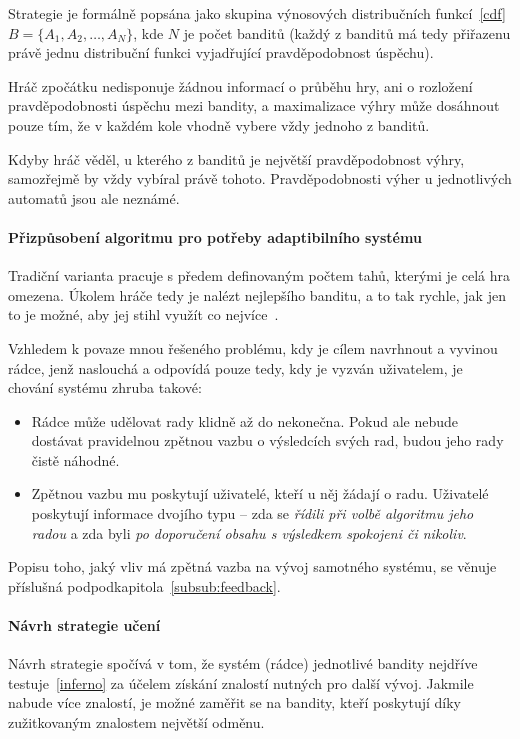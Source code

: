 \documentclass[thesis=M,czech]{FITthesis}[2014/05/07]
\begin{document}
Strategie je formálně popsána jako skupina výnosových distribučních funkcí~\ref{cdf} $B = \{ A_1, A_2, \ldots, A_N \}$, kde $N$ je počet banditů (každý z banditů má tedy přiřazenu právě jednu distribuční funkci vyjadřující pravděpodobnost úspěchu). 

Hráč zpočátku nedisponuje žádnou informací o průběhu hry, ani o rozložení pravděpodobnosti úspěchu mezi bandity, a maximalizace výhry může dosáhnout pouze tím, že v každém kole vhodně vybere vždy jednoho z banditů.

Kdyby hráč věděl, u kterého z banditů je největší pravděpodobnost výhry, samozřejmě by vždy vybíral právě tohoto. Pravděpodobnosti výher u jednotlivých automatů jsou ale neznámé.

\paragraph{Přizpůsobení algoritmu pro potřeby adaptibilního systému}
Tradiční varianta pracuje s předem definovaným počtem tahů, kterými je celá hra omezena. Úkolem hráče tedy je nalézt nejlepšího banditu, a to tak rychle, jak jen to je možné, aby jej stihl využít co nejvíce~\cite{camdp}.

Vzhledem k povaze mnou řešeného problému, kdy je cílem navrhnout a vyvinou rádce, jenž naslouchá a odpovídá pouze tedy, kdy je vyzván uživatelem, je chování systému zhruba takové:

\begin{itemize}
	\item Rádce může udělovat rady klidně až do nekonečna. Pokud ale nebude dostávat pravidelnou zpětnou vazbu o výsledcích svých rad, budou jeho rady čistě náhodné.
	\item Zpětnou vazbu mu poskytují uživatelé, kteří u něj žádají o radu. Uživatelé poskytují informace dvojího typu – zda se \emph{řídili při volbě algoritmu jeho radou} a zda byli \emph{po doporučení obsahu s výsledkem spokojeni či nikoliv}.  
\end{itemize}

Popisu toho, jaký vliv má zpětná vazba na vývoj samotného systému, se věnuje příslušná podpodkapitola~\ref{subsub:feedback}.

\paragraph{Návrh strategie učení}
	
Návrh strategie spočívá v tom, že systém (rádce) jednotlivé bandity nejdříve testuje~\ref{inferno} za účelem získání znalostí nutných pro další vývoj. Jakmile nabude více znalostí, je možné zaměřit se na bandity, kteří poskytují díky zužitkovaným znalostem největší odměnu. 
\end{document}

